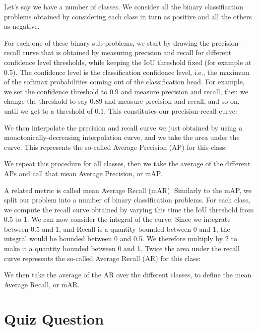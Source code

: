 Let’s say we have a number of classes. We consider all the binary classification problems obtained by considering each class in turn as positive and all the others as negative.\newline

For each one of these binary sub-problems, we start by drawing the precision-recall curve that is obtained by measuring precision and recall for different confidence level thresholds, while keeping the IoU threshold fixed (for example at 0.5). The confidence level is the classification confidence level, i.e., the maximum of the softmax probabilities coming out of the classification head. For example, we set the confidence threshold to 0.9 and measure precision and recall, then we change the threshold to say 0.89 and measure precision and recall, and so on, until we get to a threshold of 0.1. This constitutes our precision-recall curve:


We then interpolate the precision and recall curve we just obtained by using a monotonically-decreasing interpolation curve, and we take the area under the curve. This represents the so-called Average Precision (AP) for this class:


We repeat this procedure for all classes, then we take the average of the different APs and call that mean Average Precision, or mAP.\newline

A related metric is called mean Average Recall (mAR). Similarly to the mAP, we split our problem into a number of binary classification problems. For each class, we compute the recall curve obtained by varying this time the IoU threshold from 0.5 to 1. We can now consider the integral of the curve. Since we integrate between 0.5 and 1, and Recall is a quantity bounded between 0 and 1, the integral would be bounded between 0 and 0.5. We therefore multiply by 2 to make it a quantity bounded between 0 and 1. Twice the area under the recall curve represents the so-called Average Recall (AR) for this class:


We then take the average of the AR over the different classes, to define the mean Average Recall, or mAR.

\section{Quiz Question}

